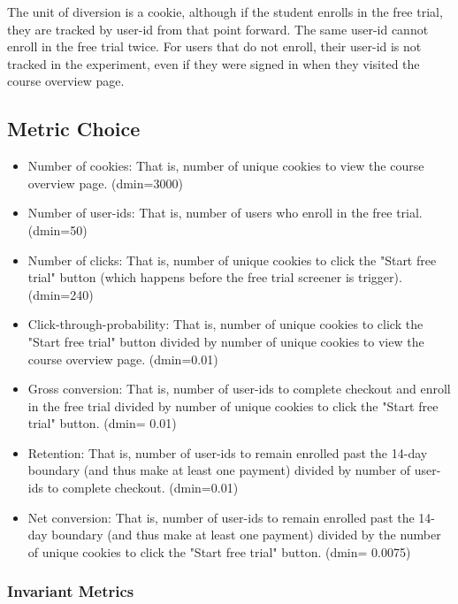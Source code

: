 \documentclass[paper=a4, fontsize=11pt]{scrartcl} %
\numberwithin{equation}{section} %
\numberwithin{figure}{section} %
\numberwithin{table}{section} %
\begin{document}
The unit of diversion is a cookie, although if the student enrolls in the free trial, they are tracked by user-id from that point forward. The same user-id cannot enroll in the free trial twice. For users that do not enroll, their user-id is not tracked in the experiment, even if they were signed in when they visited the course overview page. \newline


\subsection{Metric Choice}

\begin{itemize}
	\item Number of cookies: That is, number of unique cookies to view the course overview page. (dmin=3000)
	\item Number of user-ids: That is, number of users who enroll in the free trial. (dmin=50)
	\item Number of clicks: That is, number of unique cookies to click the "Start free trial" button (which happens before the free trial screener is trigger). (dmin=240)
	\item Click-through-probability: That is, number of unique cookies to click the "Start free trial" button divided by number of unique cookies to view the course overview page. (dmin=0.01)
	\item Gross conversion: That is, number of user-ids to complete checkout and enroll in the free trial divided by number of unique cookies to click the "Start free trial" button. (dmin= 0.01)
	\item Retention: That is, number of user-ids to remain enrolled past the 14-day boundary (and thus make at least one payment) divided by number of user-ids to complete checkout. (dmin=0.01)
	\item Net conversion: That is, number of user-ids to remain enrolled past the 14-day boundary (and thus make at least one payment) divided by the number of unique cookies to click the "Start free trial" button. (dmin= 0.0075) \newline
\end{itemize}


\subsubsection{Invariant Metrics}
\end{document}
